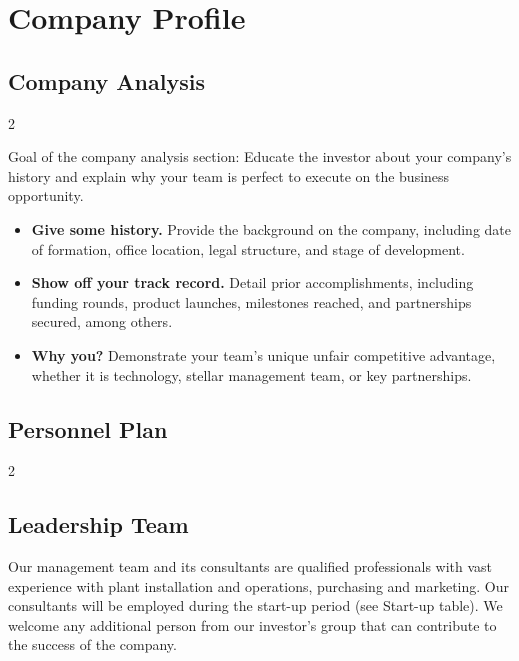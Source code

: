 \documentclass[9pt,]{book}
\providecommand{\tightlist}{%
  \setlength{\itemsep}{0pt}\setlength{\parskip}{0pt}}
\begin{document}
\hypertarget{company-profile}{%
\chapter{Company Profile}\label{company-profile}}

\hypertarget{company-analysis}{%
\section{Company Analysis}\label{company-analysis}}

\begin {multicols}{2}

Goal of the company analysis section: Educate the investor about your
company's history and explain why your team is perfect to execute on the
business opportunity.

\begin{itemize}
\tightlist
\item
  \textbf{Give some history.} Provide the background on the company,
  including date of formation, office location, legal structure, and
  stage of development.
\item
  \textbf{Show off your track record.} Detail prior accomplishments,
  including funding rounds, product launches, milestones reached, and
  partnerships secured, among others.
\item
  \textbf{Why you?} Demonstrate your team's unique unfair competitive
  advantage, whether it is technology, stellar management team, or key
  partnerships.
\end{itemize}

\end {multicols}

\hypertarget{personnel-plan}{%
\section{Personnel Plan}\label{personnel-plan}}

\begin {multicols}{2}
\lipsum[1-5]

\end {multicols}

\hypertarget{leadership-team}{%
\section{Leadership Team}\label{leadership-team}}

Our management team and its consultants are qualified professionals with
vast experience with plant installation and operations, purchasing and
marketing. Our consultants will be employed during the start-up period
(see Start-up table). We welcome any additional person from our
investor's group that can contribute to the success of the company.
\end{document}

